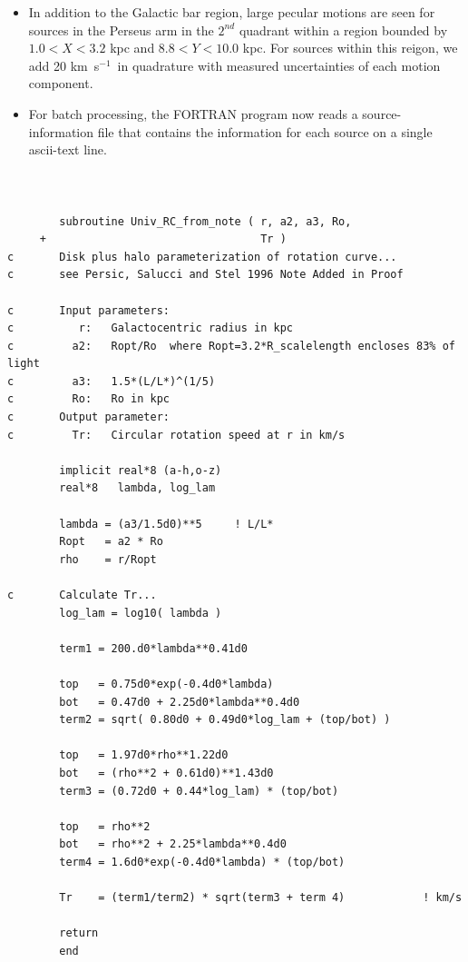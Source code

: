 \documentclass[12pt,preprint]{aastex}
\def\kms  {km~s$^{-1}$}
\begin{document}
\begin{itemize}
\item{}In addition to the Galactic bar region, large pecular motions are seen for
sources in the Perseus arm in the $2^{nd}$ quadrant within a region bounded
by $1.0 < X < 3.2$ kpc and $8.8 < Y < 10.0$ kpc.  For sources within this
reigon, we add 20 \kms\ in quadrature with measured uncertainties of each motion component.

\item{}For batch processing, the {\footnotesize FORTRAN} program now reads a source-information file
that contains the information for each source on a single ascii-text line.

\end{itemize}


\section{}
\footnotesize
\begin{lstlisting}

        subroutine Univ_RC_from_note ( r, a2, a3, Ro, 
     +                                 Tr ) 
c       Disk plus halo parameterization of rotation curve... 
c       see Persic, Salucci and Stel 1996 Note Added in Proof 

c       Input parameters:
c          r:   Galactocentric radius in kpc
c         a2:   Ropt/Ro  where Ropt=3.2*R_scalelength encloses 83% of light
c         a3:   1.5*(L/L*)^(1/5)   
c         Ro:   Ro in kpc
c       Output parameter:
c         Tr:   Circular rotation speed at r in km/s

        implicit real*8 (a-h,o-z)
        real*8   lambda, log_lam
           
        lambda = (a3/1.5d0)**5     ! L/L*
        Ropt   = a2 * Ro     
        rho    = r/Ropt

c       Calculate Tr...
        log_lam = log10( lambda )

        term1 = 200.d0*lambda**0.41d0
           
        top   = 0.75d0*exp(-0.4d0*lambda)
        bot   = 0.47d0 + 2.25d0*lambda**0.4d0
        term2 = sqrt( 0.80d0 + 0.49d0*log_lam + (top/bot) )

        top   = 1.97d0*rho**1.22d0
        bot   = (rho**2 + 0.61d0)**1.43d0
        term3 = (0.72d0 + 0.44*log_lam) * (top/bot)

        top   = rho**2
        bot   = rho**2 + 2.25*lambda**0.4d0
        term4 = 1.6d0*exp(-0.4d0*lambda) * (top/bot)

        Tr    = (term1/term2) * sqrt(term3 + term 4)            ! km/s 

        return
        end

\end{lstlisting}     
\end{document}

